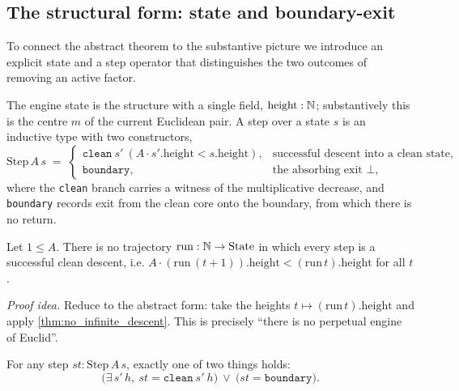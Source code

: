 \subsection{The structural form: state and boundary-exit}

To connect the abstract theorem to the substantive picture we introduce an explicit state and a
step operator that distinguishes the two outcomes of removing an active factor.

\begin{definition}\label{thm:State}
The engine state is the structure with a single field, $\mathrm{height}:\mathbb{N}$; substantively this is
the centre $m$ of the current Euclidean pair. A step over a state $s$ is an inductive type with two
constructors,
\begin{equation}\label{eq:step}
  \mathrm{Step}\,A\,s \;=\;
  \begin{cases}
    \texttt{clean}\ s'\ (A\cdot s'.\mathrm{height} < s.\mathrm{height}), & \text{successful descent into a clean state,}\\[2pt]
    \texttt{boundary}, & \text{the absorbing exit } \bot,
  \end{cases}
\end{equation}
where the \texttt{clean} branch carries a witness of the multiplicative decrease, and
\texttt{boundary} records exit from the clean core onto the boundary, from which there is no
return. 
\end{definition}

\begin{theorem}\label{thm:no_perpetual_engine}
\green{}\; Let $1\le A$. There is no trajectory $\mathrm{run}:\mathbb{N}\to\mathrm{State}$ in which every
step is a successful clean descent, i.e.
$A\cdot(\mathrm{run}\,(t+1)).\mathrm{height} < (\mathrm{run}\,t).\mathrm{height}$ for all $t$.
\end{theorem}

\emph{Proof idea.} Reduce to the abstract form: take the heights $t\mapsto(\mathrm{run}\,t).\mathrm{height}$
and apply \cref{thm:no_infinite_descent}. This is precisely ``there is no perpetual engine of
Euclid''.

\begin{theorem}\label{thm:boundary_dichotomy}
\green{}\; For any step $st:\mathrm{Step}\,A\,s$, exactly one of two things holds:
\begin{equation}\label{eq:dichotomy}
  \bigl(\exists\, s'\,h,\ st = \texttt{clean}\ s'\ h\bigr)\ \lor\ \bigl(st = \texttt{boundary}\bigr).
\end{equation}
\end{theorem}

